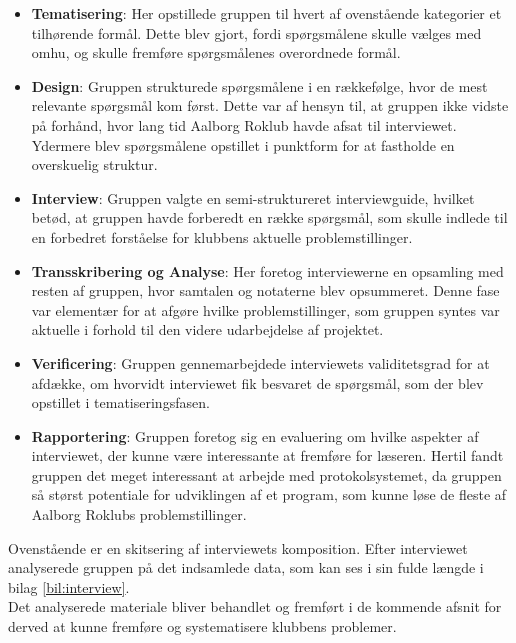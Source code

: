 \begin{itemize}
    \item \textbf{Tematisering}: Her opstillede gruppen til hvert af ovenstående kategorier et tilhørende formål. Dette blev gjort, fordi spørgsmålene skulle vælges med omhu, og skulle fremføre spørgsmålenes overordnede formål.
    \item \textbf{Design}: Gruppen strukturede spørgsmålene i en rækkefølge, hvor de mest relevante spørgsmål kom først. Dette var af hensyn til, at gruppen ikke vidste på forhånd, hvor lang tid Aalborg Roklub havde afsat til interviewet. Ydermere blev spørgsmålene opstillet i punktform for at fastholde en overskuelig struktur.
    \item \textbf{Interview}: Gruppen valgte en semi-struktureret interviewguide, hvilket betød, at gruppen havde forberedt en række spørgsmål, som skulle indlede til en forbedret forståelse for klubbens aktuelle problemstillinger.
    \item \textbf{Transskribering og Analyse}: Her foretog interviewerne en opsamling med resten af gruppen, hvor samtalen og notaterne blev opsummeret. Denne fase var elementær for at afgøre hvilke problemstillinger, som gruppen syntes var aktuelle i forhold til den videre udarbejdelse af projektet. 
    \item \textbf{Verificering}: Gruppen gennemarbejdede interviewets validitetsgrad for at afdække, om hvorvidt interviewet fik besvaret de spørgsmål, som der blev opstillet i tematiseringsfasen.
    \item \textbf{Rapportering}: Gruppen foretog sig en evaluering om hvilke aspekter af interviewet, der kunne være interessante at fremføre for læseren. Hertil fandt gruppen det meget interessant at arbejde med protokolsystemet, da gruppen så størst potentiale for udviklingen af et program, som kunne løse de fleste af Aalborg Roklubs problemstillinger.
\end{itemize}

Ovenstående er en skitsering af interviewets komposition. Efter interviewet analyserede gruppen på det indsamlede data, som kan ses i sin fulde længde i bilag \ref{bil:interview}. \\

Det analyserede materiale bliver behandlet og fremført i de kommende afsnit for derved at kunne fremføre og systematisere klubbens problemer.